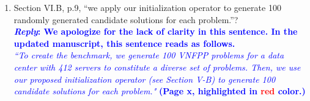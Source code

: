 \begin{enumerate}
      \item\textsf{Section VI.B, p.9, “we apply our initialization operator to generate 100 randomly generated candidate solutions for each problem.”?}\\
            \textcolor{blue}{\textbf{\textit{Reply}: We apologize for the lack of clarity in this sentence. In the updated manuscript, this sentence reads as follows.}}\\
            \textcolor{blue}{\textit{``To create the benchmark, we generate 100 VNFPP problems for a data center with 412 servers to constitute a diverse set of
                        problems. Then, we use our proposed initialization operator (see Section V-B) to generate 100 candidate solutions for each problem."} \textbf{(Page x, highlighted in \textcolor{red}{red} color.)}}\\


\end{enumerate}
